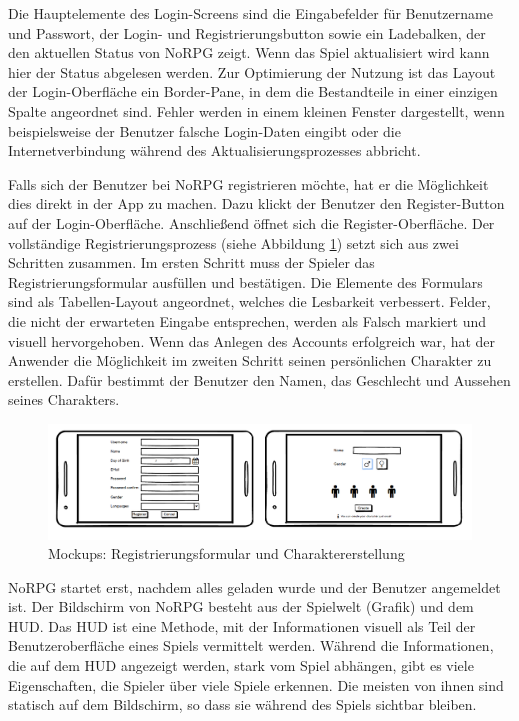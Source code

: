 			Die Hauptelemente des Login-Screens sind die Eingabefelder für Benutzername und Passwort, der Login- und Registrierungsbutton sowie ein Ladebalken, der den aktuellen Status von NoRPG zeigt. Wenn das Spiel aktualisiert wird kann hier der Status abgelesen werden. Zur Optimierung der Nutzung ist das Layout der Login-Oberfläche ein Border-Pane, in dem die Bestandteile in einer einzigen Spalte angeordnet sind. Fehler werden in einem kleinen Fenster dargestellt, wenn beispielsweise der Benutzer falsche Login-Daten eingibt oder die Internetverbindung während des Aktualisierungsprozesses abbricht.
			
			Falls sich der Benutzer bei NoRPG registrieren möchte, hat er die Möglichkeit dies direkt in der App zu machen. Dazu klickt der Benutzer den Register-Button auf der Login-Oberfläche. Anschließend öffnet sich die Register-Oberfläche. Der vollständige Registrierungsprozess (siehe Abbildung \ref{mockupsRegistrierung}) setzt sich aus zwei Schritten zusammen. Im ersten Schritt muss der Spieler das Registrierungsformular ausfüllen und bestätigen. Die Elemente des Formulars sind als Tabellen-Layout angeordnet, welches die Lesbarkeit verbessert. Felder, die nicht der erwarteten Eingabe entsprechen, werden als Falsch markiert und visuell hervorgehoben. Wenn das Anlegen des Accounts erfolgreich war, hat der Anwender die Möglichkeit im zweiten Schritt seinen persönlichen Charakter zu erstellen. Dafür bestimmt der Benutzer den Namen, das Geschlecht und Aussehen seines Charakters.
			
			\begin{figure}[htbp]
				\centering 
				\label{mockupsRegistrierung}
				\includegraphics[width=\textwidth]{pics/Registerprozess.png}
				\caption{Mockups: Registrierungsformular und Charaktererstellung}
			\end{figure}
		
			NoRPG startet erst, nachdem alles geladen wurde und der Benutzer angemeldet ist. Der Bildschirm von NoRPG besteht aus der Spielwelt (Grafik) und dem \ac{HUD}. Das \ac{HUD} ist eine Methode, mit der Informationen visuell als Teil der Benutzeroberfläche eines Spiels vermittelt werden. Während die Informationen, die auf dem \ac{HUD} angezeigt werden, stark vom Spiel abhängen, gibt es viele Eigenschaften, die Spieler über viele Spiele erkennen. Die meisten von ihnen sind statisch auf dem Bildschirm, so dass sie während des Spiels sichtbar bleiben.  
			
